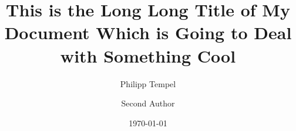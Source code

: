 \documentclass[%
  english,%
  oneside,%
]{iswartcl}
\author{Philipp Tempel \and Second Author}
\date{\today}
\title{This is the Long Long Title of My Document Which is Going to Deal with Something Cool}
\begin{document}
\maketitle



\begin{otherlanguage}{ngerman}
 \maketitle
\end{otherlanguage}



\begin{abstract}
  \Blindtext[3]
  
\end{abstract}



\begin{otherlanguage}{ngerman}
  \begin{abstract}
    \Blindtext[3]
       
  \end{abstract}
\end{otherlanguage}




\tableofcontents

\listoffigures

\listoftables

\listoftodos





\Blinddocument

\end{document}
